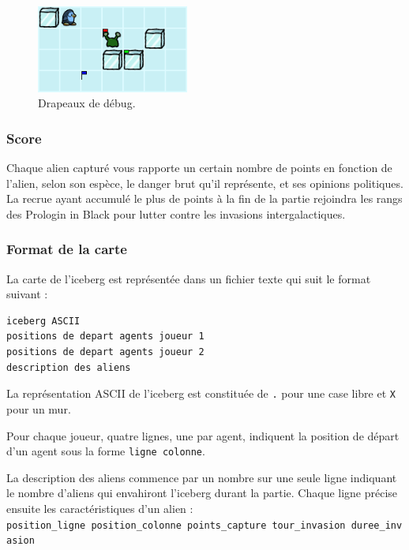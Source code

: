 \begin{figure}[!h]
    \centering
    \includegraphics[width=5cm]{img/debug_flags}
    \caption*{Drapeaux de débug.}
\end{figure}

\subsubsection{Score}\label{score}

Chaque alien capturé vous rapporte un certain nombre de points en
fonction de l'alien, selon son espèce, le danger brut qu'il représente,
et ses opinions politiques. La recrue ayant accumulé le plus de points à
la fin de la partie rejoindra les rangs des Prologin in Black pour
lutter contre les invasions intergalactiques.

\subsubsection{Format de la carte}\label{format-de-la-carte}

La carte de l'iceberg est représentée dans un fichier texte qui suit le
format suivant :

\begin{verbatim}
iceberg ASCII
positions de depart agents joueur 1
positions de depart agents joueur 2
description des aliens
\end{verbatim}

La représentation ASCII de l'iceberg est constituée de \texttt{.} pour
une case libre et \texttt{X} pour un mur.

Pour chaque joueur, quatre lignes, une par agent, indiquent la position
de départ d'un agent sous la forme \texttt{ligne\ colonne}.

La description des aliens commence par un nombre sur une seule ligne
indiquant le nombre d'aliens qui envahiront l'iceberg durant la partie.
Chaque ligne précise ensuite les caractéristiques d'un alien :
\texttt{position\_ligne\ position\_colonne\ points\_capture\ tour\_invasion\ duree\_invasion}
